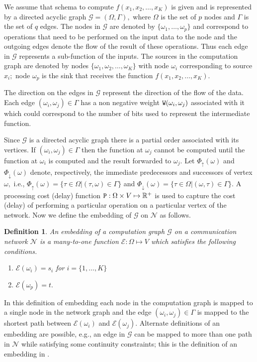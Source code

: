 \documentclass[journal]{IEEEtran}
\newtheorem{definition}{{\bf Definition}}
\newcommand{\net}{\mathcal{N}}
\newcommand{\netnodes}{V}
\newcommand{\compgraph}{\mathcal{G}}
\newcommand{\compnodes}{\Omega}
\newcommand{\compedges}{\Gamma}
\newcommand{\prenodes}[1]{\Phi_{\uparrow}(#1)}
\newcommand{\sucnodes}[1]{\Phi_{\downarrow}(#1)}
\newcommand{\embedding}{\mathcal{E}}
\begin{document}
We assume that schema to compute $f(x_1,x_2, \ldots, x_K)$ is given
and is represented by a directed acyclic graph $\compgraph =
(\compnodes,\compedges),$ where $\compnodes$ is the set of $p$ nodes
and $\compedges$ is the set of $q$ edges. The nodes in $\compgraph$
are denoted by $\{\omega_1, \ldots, \omega_p\}$ and correspond to
operations that need to be performed on the input data to the node and
the outgoing edges denote the flow of the result of these
operations. Thus each edge in $\compgraph$ represents a sub-function
of the inputs. The sources in the computation graph are denoted by
nodes $\{\omega_1,\omega_2,\ldots,\omega_K\}$ with node $\omega_i$
corresponding to source $x_i;$ node $\omega_p$ is the sink that
receives the function $f(x_1,x_2, \ldots, x_K).$

The direction on the edges in $\compgraph$ represent the direction of
the flow of the data.  Each edge $(\omega_i,\omega_j) \in \compedges$
has a non negative weight $\mathtt{W}(\omega_i,\omega_j)$ associated with
it which could correspond to the number of bits used to represent the
intermediate function. 

Since $\compgraph$ is a directed acyclic graph there is a partial
order associated with its vertices. If $(\omega_i,\omega_j) \in
\compedges$ then the function at $\omega_j$ cannot be computed until
the function at $\omega_i$ is computed and the result forwarded to
$\omega_j.$ Let $\prenodes \omega$ and $\sucnodes \omega$ denote,
respectively, the immediate predecessors and successors of vertex
$\omega,$ i.e., $\prenodes \omega = \{\tau \in \compnodes | (\tau,\omega) \in \compedges\}$ and $\sucnodes \omega = \{\tau \in \compnodes | (\omega,\tau) \in \compedges\}.$
A processing cost (delay) function $\processingwt: \compnodes \times
\netnodes \mapsto \mathbb{R}^+$ is used to capture the cost (delay) of
performing a particular operation on a particular vertex of the
network. Now we define the embedding of $\compgraph$ on $\net$ as
follows.
\begin{definition}
  \label{def:embedding}
  An embedding of a computation graph $\compgraph$ on a communication
  network $\net$ is a many-to-one function $\embedding: \compnodes
  \mapsto \netnodes$ which satisfies the following conditions. 
  \begin{enumerate}
  \item $\embedding(\omega_i) = s_i$ for $i=\{1,\ldots,K\}$
  \item $\embedding(\omega_p) = t.$
  \end{enumerate}
\end{definition}
In this definition of embedding each node in the computation graph is
mapped to a single node in the network graph and the edge
$(\omega_i,\omega_j) \in \compedges$ is mapped to the shortest path
between $\embedding(\omega_i)$ and $\embedding(\omega_j).$ Alternate
definitions of an embedding are possible, e.g., an edge in
$\compgraph$ can be mapped to more than one path in $\net$ while
satisfying some continuity constraints; this is the definition of an
embedding in \cite{Shah13}. 
\end{document}
